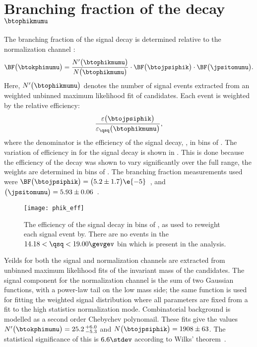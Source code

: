\section[Branching fraction of the decay \btophikmumu]
{Branching fraction of the decay $\boldsymbol{\btophikmumu}$}

The branching fraction of the signal decay \btophikmumu is determined relative to the normalization
channel \btojpsiphik:
\begin{equation}
  \BF\big(\btokphimumu\big)=
  \frac{ N^\prime\big(\btophikmumu\big) }{ N\big(\btophikmumu\big) }
  \cdot\BF\big(\btojpsiphik\big)
  \cdot\BF\big(\jpsitomumu\big).
\end{equation}
Here, $N^\prime\big(\btophikmumu\big)$ denotes the number of signal events extracted from an
weighted unbinned maximum likelihood fit of \btophikmumu candidates.
Each event is weighted by the relative efficiency:
\begin{equation}
  \frac{\varepsilon\big(\btojpsiphik\big)}{\varepsilon_{\qsq}\big(\btophikmumu\big)},
\end{equation}
where the denominator is the efficiency of the signal decay, \btophikmumu, in bins of \qsq.
The variation of efficiency in \qsq for the signal decay is shown in
.
This is done because the efficiency of the decay \btophikmumu was shown to vary significantly over
the full \qsq range, the weights are determined in bins of \qsq.
The branching fraction measurements used were
$\BF\big(\btojpsiphik\big)=\big(5.2\pm1.7\big)\e{-5}$~\cite{PDG2012},
and $\big(\jpsitomumu\big)=5.93\pm0.06$~\cite{PDG2012}.

\begin{figure}
  \begin{center}
    \texttt{[image: phik\_eff]}
    \caption{\small
      The efficiency of the signal decay \btokphimumu in bins of \qsq, as used to reweight each
      signal event by.
      There are no events in the $14.18<\qsq<19.00\gevgev$ bin which is present in the
      \btokpipimumu analysis.
    }
    \label{fig:hhh:phikeff}
  \end{center}
\end{figure}

Yeilds for both the signal and normalization channels are extracted from unbinned maximum
likelihood fits of the invariant mass of the \Bp candidates.
The signal component for the normalization channel is the sum of two Gaussian functions, with a
power-law tail on the low mass side; the same function is used for fitting the weighted signal
distribution where all parameters are fixed from a fit to the high statistics normalization mode.
Combinatorial background is modelled as a second order Chebychev polynomail.
These fits give the values
$N^\prime\big(\btokphimumu\big)=25.2\,^{+6.0}_{-5.3}$ and
$N\big(\btojpsiphik\big)=1908\pm63$.
The statistical significance of this is $6.6\stdev$ according to Wilks' theorem~\cite{wilks1938}.

